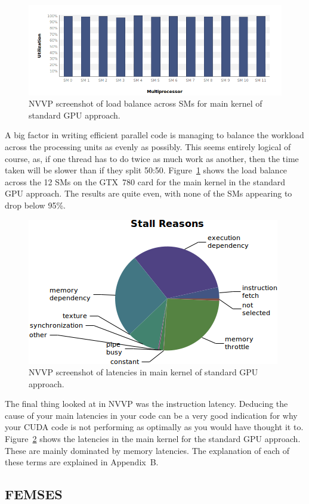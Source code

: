 \begin{figure}
	\centering
	\includegraphics[width = 0.7\linewidth]{Figures/sparse_load}
	\caption{NVVP screenshot of load balance across SMs for main kernel of standard GPU approach.}
	\label{fig:sparse_load}
\end{figure}
A big factor in writing efficient parallel code is managing to balance the workload across the processing units as evenly as possibly. This seems entirely logical of course, as, if one thread has to do twice as much work as another, then the time taken will be slower than if they split 50:50. Figure~\ref{fig:sparse_load} shows the load balance across the 12 SMs on the GTX~780 card for the main kernel in the standard GPU approach. The results are quite even, with none of the SMs appearing to drop below 95\%.

\begin{figure}
	\centering
	\includegraphics[width = 0.55\linewidth]{Figures/sparse_instruction_latency}
	\caption{NVVP screenshot of latencies in main kernel of standard GPU approach.}
	\label{fig:sparse_latencies}
\end{figure}
The final thing looked at in NVVP was the instruction latency. Deducing the cause of your main latencies in your code can be a very good indication for why your CUDA code is not performing as optimally as you would have thought it to. Figure~\ref{fig:sparse_latencies} shows the latencies in the main kernel for the standard GPU approach. These are mainly dominated by memory latencies. The explanation of each of these terms are explained in Appendix~B.

\subsection{FEMSES}

